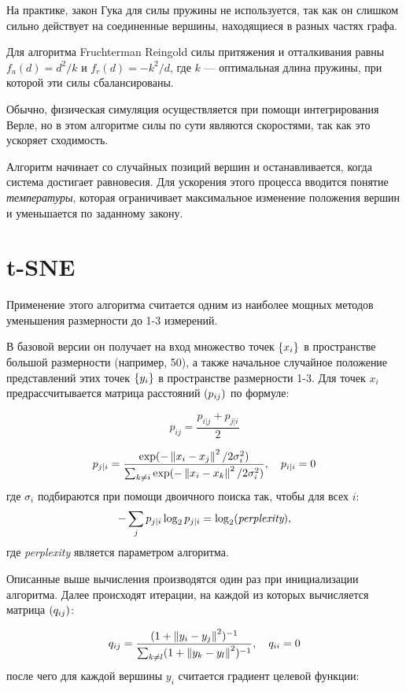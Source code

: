 На практике, закон Гука для силы пружины не используется, так как он слишком сильно действует на соединенные вершины, находящиеся в разных частях графа.

Для алгоритма Fruchterman Reingold силы притяжения и отталкивания равны $f_a(d) = d^2 / k$ и $f_r(d) = -k^2 / d$, где $k$ --- оптимальная длина пружины, при которой эти силы сбалансированы.

Обычно, физическая симуляция осуществляется при помощи интегрирования Верле, но в этом алгоритме силы по сути являются скоростями, так как это ускоряет сходимость.

Алгоритм начинает со случайных позиций вершин и останавливается, когда система достигает равновесия. Для ускорения этого процесса вводится понятие {\itshape температуры}, которая ограничивает максимальное изменение положения вершин и уменьшается по заданному закону.

\section{t-SNE}

Применение этого алгоритма считается одним из наиболее мощных методов уменьшения размерности до 1-3 измерений.

В базовой версии он получает на вход множество точек $\left\{x_i\right\}$ в пространстве большой размерности (например, 50), а также начальное случайное положение представлений этих точек $\left\{y_i\right\}$ в пространстве размерности 1-3. Для точек $x_i$ предрассчитывается матрица расстояний $\left(p_{ij}\right)$ по формуле:

$$p_{ij} = \frac{p_{i|j} + p_{j|i}}{2}$$

\begin{equation}
  p_{j|i} = \frac{\exp(-\left\lVert x_i - x_j\right\rVert^2 / 2 \sigma_i^2)}{\sum_{k\neq i}\exp(-\left\lVert x_i - x_k\right\rVert^2 / 2 \sigma_i^2)},\quad p_{i|i} = 0
  \label{eq:p_conditional}
\end{equation}
где $\sigma_i$ подбираются при помощи двоичного поиска так, чтобы для всех $i$:
$$-\sum_j p_{j|i} \log_2 p_{j|i} = \log_2(\mbox{\itshape perplexity}),$$
где {\itshape perplexity} является параметром алгоритма.

Описанные выше вычисления производятся один раз при инициализации алгоритма. Далее происходят итерации, на каждой из которых вычисляется матрица $\left(q_{ij}\right)$:

$$ q_{ij} = \frac{(1 + \left\lVert y_i - y_j\right\rVert^2)^{-1}}{\sum_{k\neq l}(1 + \left\lVert y_k - y_l\right\rVert^2)^{-1}},\quad q_{ii} = 0$$
после чего для каждой вершины $y_i$ считается градиент целевой функции:

